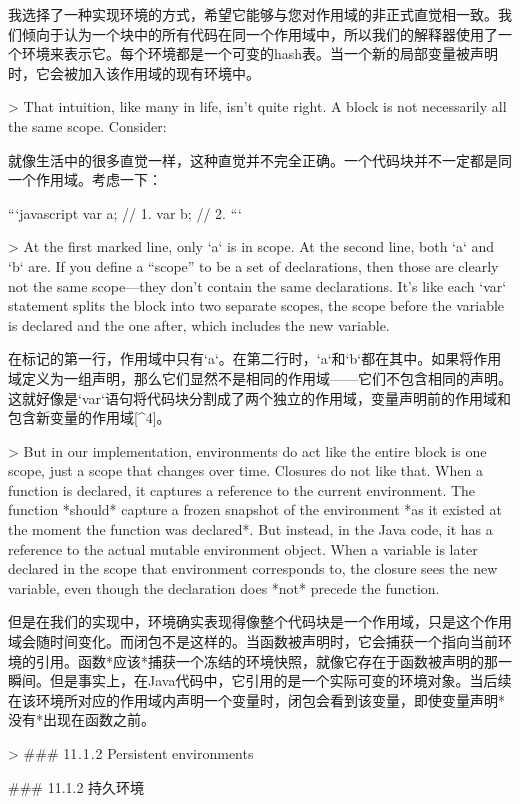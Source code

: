 \documentclass[cn,11pt,chinese]{elegantbook}
\begin{document}
{{{{{{{{{{{{我选择了一种实现环境的方式，希望它能够与您对作用域的非正式直觉相一致。我们倾向于认为一个块中的所有代码在同一个作用域中，所以我们的解释器使用了一个环境来表示它。每个环境都是一个可变的hash表。当一个新的局部变量被声明时，它会被加入该作用域的现有环境中。

> That intuition, like many in life, isn’t quite right. A block is not necessarily all the same scope. Consider:

就像生活中的很多直觉一样，这种直觉并不完全正确。一个代码块并不一定都是同一个作用域。考虑一下：

```javascript
{
  var a;
  // 1.
  var b;
  // 2.
}
```

> At the first marked line, only `a` is in scope. At the second line, both `a` and `b` are. If you define a “scope” to be a set of declarations, then those are clearly not the same scope—they don’t contain the same declarations. It’s like each `var` statement splits the block into two separate scopes, the scope before the variable is declared and the one after, which includes the new variable.

在标记的第一行，作用域中只有`a`。在第二行时，`a`和`b`都在其中。如果将作用域定义为一组声明，那么它们显然不是相同的作用域——它们不包含相同的声明。这就好像是`var`语句将代码块分割成了两个独立的作用域，变量声明前的作用域和包含新变量的作用域[^4]。

> But in our implementation, environments do act like the entire block is one scope, just a scope that changes over time. Closures do not like that. When a function is declared, it captures a reference to the current environment. The function *should* capture a frozen snapshot of the environment *as it existed at the moment the function was declared*. But instead, in the Java code, it has a reference to the actual mutable environment object. When a variable is later declared in the scope that environment corresponds to, the closure sees the new variable, even though the declaration does *not* precede the function.

但是在我们的实现中，环境确实表现得像整个代码块是一个作用域，只是这个作用域会随时间变化。而闭包不是这样的。当函数被声明时，它会捕获一个指向当前环境的引用。函数*应该*捕获一个冻结的环境快照，就像它存在于函数被声明的那一瞬间。但是事实上，在Java代码中，它引用的是一个实际可变的环境对象。当后续在该环境所对应的作用域内声明一个变量时，闭包会看到该变量，即使变量声明*没有*出现在函数之前。

> ### 11 . 1 . 2 Persistent environments

### 11.1.2 持久环境

}}}}}}}}}}}}
\end{document}
